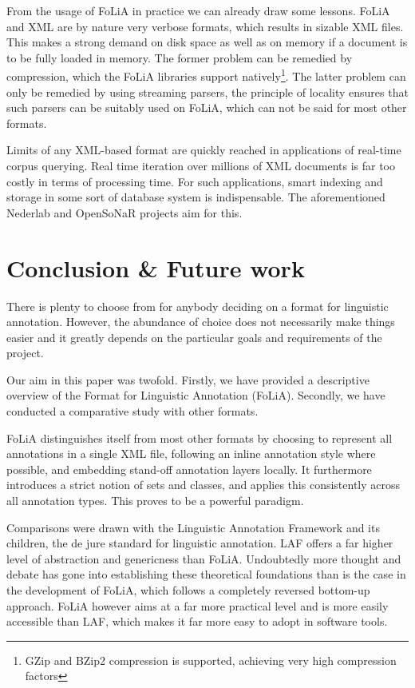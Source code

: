 \documentclass[a4paper,10pt,twoside]{article}
\begin{document}
From the usage of FoLiA in practice we can already draw some lessons. FoLiA and
XML are by nature very verbose formats, which results in sizable XML files.
This makes a strong demand on disk space as well as on memory if a document is
to be fully loaded in memory. The former problem can be remedied by
compression, which the FoLiA libraries support natively\footnote{GZip and BZip2
compression is supported, achieving very high compression factors}. The latter
problem can only be remedied by using streaming parsers, the principle of
locality ensures that such parsers can be suitably used on FoLiA, which can not
be said for most other formats.

Limits of any XML-based format are quickly reached in applications of real-time corpus
querying. Real time iteration over millions of XML documents is far too costly in terms
of processing time. For such applications, smart indexing and storage in some sort of
database system is indispensable. The aforementioned Nederlab and OpenSoNaR
projects aim for this. 

\section{Conclusion \& Future work}

There is plenty to choose from for anybody deciding on a format for
linguistic annotation. However, the abundance of choice does not necessarily make
things easier and it greatly depends on the particular goals and requirements of the
project.  

Our aim in this paper was twofold. Firstly, we have provided a descriptive
overview of the Format for Linguistic Annotation (FoLiA). Secondly, we have
conducted a comparative study with other formats.

FoLiA distinguishes itself from most other formats by choosing to represent
all annotations in a single XML file, following an inline annotation style where
possible, and embedding stand-off annotation layers locally. It furthermore
introduces a strict notion of sets and classes, and applies this consistently
across all annotation types. This proves to be a powerful paradigm.

Comparisons were drawn with the Linguistic Annotation Framework and its
children, the de jure standard for linguistic annotation. LAF offers a far
higher level of abstraction and genericness than FoLiA. Undoubtedly more
thought and debate has gone into establishing these theoretical foundations
than is the case in the development of FoLiA, which follows a completely
reversed bottom-up approach. FoLiA however aims at a far more practical level and is
more easily accessible than LAF, which makes it far more easy to adopt in
software tools. 
\end{document}
